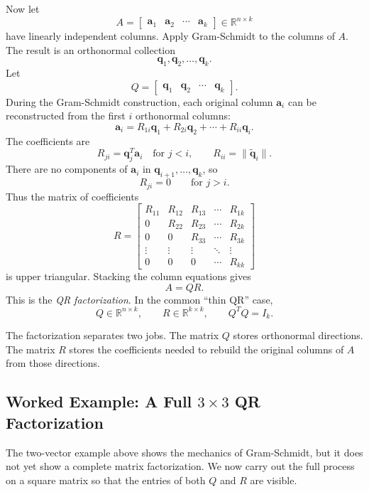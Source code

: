 Now let
\[
    A=\begin{bmatrix}
        \mathbf{a}_1 & \mathbf{a}_2 & \cdots & \mathbf{a}_k
    \end{bmatrix}
    \in\mathbb{R}^{n\times k}
\]
have linearly independent columns. Apply Gram-Schmidt to the columns of \(A\). The result is an orthonormal collection
\[
    \mathbf{q}_1,\mathbf{q}_2,\ldots,\mathbf{q}_k.
\]
Let
\[
    Q=\begin{bmatrix}
        \mathbf{q}_1 & \mathbf{q}_2 & \cdots & \mathbf{q}_k
    \end{bmatrix}.
\]
During the Gram-Schmidt construction, each original column \(\mathbf{a}_i\) can be reconstructed from the first \(i\) orthonormal columns:
\[
    \mathbf{a}_i
    =
    R_{1i}\mathbf{q}_1+R_{2i}\mathbf{q}_2+\cdots+R_{ii}\mathbf{q}_i.
\]
The coefficients are
\[
    R_{ji}=\mathbf{q}_j^T\mathbf{a}_i \quad \text{for } j<i,
    \qquad
    R_{ii}=\|\widetilde{\mathbf{q}}_i\|.
\]
There are no components of \(\mathbf{a}_i\) in \(\mathbf{q}_{i+1},\ldots,\mathbf{q}_k\), so
\[
    R_{ji}=0 \qquad \text{for } j>i.
\]
Thus the matrix of coefficients
\[
    R=\begin{bmatrix}
        R_{11} & R_{12} & R_{13} & \cdots & R_{1k}\\
        0      & R_{22} & R_{23} & \cdots & R_{2k}\\
        0      & 0      & R_{33} & \cdots & R_{3k}\\
        \vdots & \vdots & \vdots & \ddots & \vdots\\
        0      & 0      & 0      & \cdots & R_{kk}
    \end{bmatrix}
\]
is upper triangular. Stacking the column equations gives
\[
    A=QR.
\]
This is the \emph{QR factorization}. In the common ``thin QR'' case,
\[
    Q\in\mathbb{R}^{n\times k},
    \qquad
    R\in\mathbb{R}^{k\times k},
    \qquad
    Q^TQ=I_k.
\]

The factorization separates two jobs. The matrix \(Q\) stores orthonormal directions. The matrix \(R\) stores the coefficients needed to rebuild the original columns of \(A\) from those directions.

\subsection[Worked Example: A Full 3x3 QR Factorization]{Worked Example: A Full \(3\times 3\) QR Factorization}
\label{mf:qr-factorization-worked-example}

The two-vector example above shows the mechanics of Gram-Schmidt, but it does not yet show a complete matrix factorization. We now carry out the full process on a square matrix so that the entries of both \(Q\) and \(R\) are visible.

